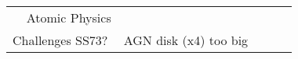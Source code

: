 \documentclass[11pt]{article}
\begin{document}
\begin{table}
\begin{center}
\begin{tabular}{lcccr}
$\;\;\;\;$Atomic Physics                    & & & \\
Challenges SS73?              & AGN disk (x4) too big      &     &     \\
        \hline
        \hline 
     \end{tabular}
  \end{center}
\end{table}




%
%
\end{document}
